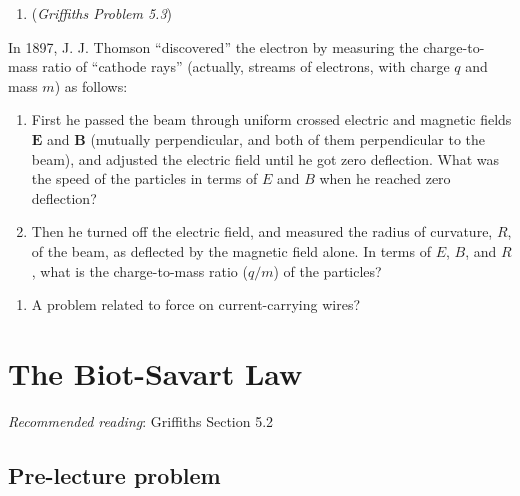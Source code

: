 \documentclass[
  letterpaper,
  DIV=11,
  numbers=noendperiod]{scrreprt}
\providecommand{\tightlist}{%
  \setlength{\itemsep}{0pt}\setlength{\parskip}{0pt}}\usepackage{longtable,booktabs,array}
\begin{document}
\begin{enumerate}
\def\labelenumi{\arabic{enumi})}
\setcounter{enumi}{1}
\tightlist
\item
  (\emph{Griffiths Problem 5.3})
\end{enumerate}

In 1897, J. J. Thomson ``discovered'' the electron by measuring the
charge-to-mass ratio of ``cathode rays'' (actually, streams of
electrons, with charge \(q\) and mass \(m\)) as follows:

\begin{enumerate}
\def\labelenumi{(\alph{enumi})}
\item
  First he passed the beam through uniform crossed electric and magnetic
  fields \(\mathrm{\mathbf{E}}\) and \(\mathrm{\mathbf{B}}\) (mutually
  perpendicular, and both of them perpendicular to the beam), and
  adjusted the electric field until he got zero deflection. What was the
  speed of the particles in terms of \(E\) and \(B\) when he reached
  zero deflection?
\item
  Then he turned off the electric field, and measured the radius of
  curvature, \(R\), of the beam, as deflected by the magnetic field
  alone. In terms of \(E\), \(B\), and \(R\), what is the charge-to-mass
  ratio (\(q/m\)) of the particles?
\end{enumerate}

\begin{enumerate}
\def\labelenumi{\arabic{enumi})}
\setcounter{enumi}{2}
\tightlist
\item
  A problem related to force on current-carrying wires?
\end{enumerate}


\chapter{The Biot-Savart Law}\label{the-biot-savart-law}

\newcommand{\l}{\mathrm{\mathbf{l}}}
\newcommand{\E}{\mathrm{\mathbf{E}}}
\newcommand{\F}{\mathrm{\mathbf{F}}}
\newcommand{\r}{\mathrm{\mathbf{r}}}

\newcommand{\x}{\mathrm{\mathbf{x}}}
\newcommand{\y}{\mathrm{\mathbf{y}}}
\newcommand{\z}{\mathrm{\mathbf{z}}}
\newcommand{\dd}{\mathrm{d}}

\emph{Recommended reading}: Griffiths Section 5.2

\section{Pre-lecture problem}\label{pre-lecture-problem-3}
\end{document}
